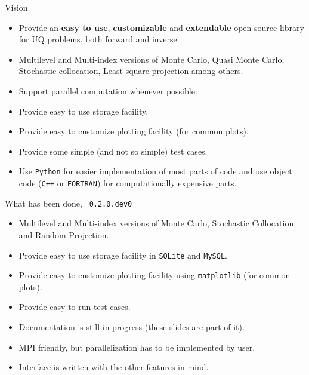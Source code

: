 \begin{frame}{Vision}
  \begin{itemize}
  \item Provide an \textbf{easy to use}, \textbf{customizable} and
    \textbf{extendable} open source library for UQ problems, both
    forward and inverse.
  \item Multilevel and Multi-index versions of Monte Carlo, Quasi Monte
    Carlo, Stochastic collocation, Least square projection among
    others.
  \item Support parallel computation whenever possible.
  \item Provide easy to use storage facility.
  \item Provide easy to customize plotting facility (for common
    plots).
  \item Provide some simple (and not so simple) test cases.
  \item Use \texttt{Python} for easier implementation of most parts of code
    and use object code (\texttt{C++} or \texttt{FORTRAN}) for
    computationally expensive parts.
  \end{itemize}
\end{frame}

\begin{frame}{What has been done, \lib~\texttt{0.2.0.dev0}}
  \begin{itemize}
  \item Multilevel and Multi-index versions of Monte Carlo, Stochastic
    Collocation and Random Projection.
  \item Provide easy to use storage facility in \texttt{SQLite} and \texttt{MySQL}.
  \item Provide easy to customize plotting facility using \texttt{matplotlib} (for common
    plots).
  \item Provide easy to run test cases.
  \item Documentation is still in progress (these slides are part of
    it).
  \item MPI friendly, but parallelization has to be implemented by
    user.
  \item Interface is written with the other features in mind.
  \end{itemize}
\end{frame}

